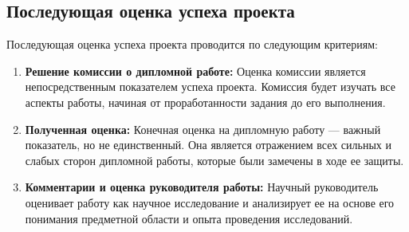 \documentclass{article}
\begin{document}
    \subsection {Последующая оценка успеха проекта}
    Последующая оценка успеха проекта проводится по следующим критериям:
    \begin{enumerate}
        \item \textbf{Решение комиссии о дипломной работе:} Оценка комиссии является непосредственным показателем успеха проекта. Комиссия будет изучать все аспекты работы, начиная от проработанности задания до его выполнения.

        \item \textbf{Полученная оценка:} Конечная оценка на дипломную работу — важный показатель, но не единственный. Она является отражением всех сильных и слабых сторон дипломной работы, которые были замечены в ходе ее защиты.

        \item \textbf{Комментарии и оценка руководителя работы:} Научный руководитель оценивает работу как научное исследование и анализирует ее на основе его понимания предметной области и опыта проведения исследований.
    \end{enumerate}
\end{document}
